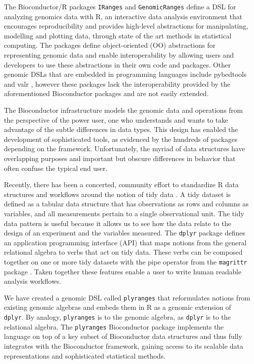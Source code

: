 \documentclass[]{article}
\begin{document}
The Bioconductor/R packages \texttt{IRanges} and \texttt{GenomicRanges}
\autocites{r-core}{Lawrence2013-wg}{Huber2015-ei} define a DSL for
analyzing genomics data with R, an interactive data analysis environment
that encourages reproducibility and provides high-level abstractions for
manipulating, modelling and plotting data, through state of the art
methods in statistical computing. The packages define object-oriented
(OO) abstractions for representing genomic data and enable
interoperability by allowing users and developers to use these
abstractions in their own code and packages. Other genomic DSLs that are
embedded in programming languages include pybedtools and valr
\autocites{Dale2011-js}{Kent2017}, however these packages lack the
interoperability provided by the aforementioned Bioconductor packages
and are not easily extended.

The Bioconductor infrastructure models the genomic data and operations
from the perspective of the power user, one who understands and wants to
take advantage of the subtle differences in data types. This design has
enabled the development of sophisticated tools, as evidenced by the
hundreds of packages depending on the framework. Unfortunately, the
myriad of data structures have overlapping purposes and important but
obscure differences in behavior that often confuse the typical end user.

Recently, there has been a concerted, community effort to standardize R
data structures and workflows around the notion of tidy data
\cite{Wickham2014-jc}. A tidy dataset is defined as a tabular data
structure that has observations as rows and columns as variables, and
all measurements pertain to a single observational unit. The tidy data
pattern is useful because it allows us to see how the data relate to the
design of an experiment and the variables measured. The \texttt{dplyr}
package \cite{Wickham2017-dplyr} defines an application programming
interface (API) that maps notions from the general relational algebra to
verbs that act on tidy data. These verbs can be composed together on one
or more tidy datasets with the pipe operator from the \texttt{magrittr}
package \cite{R-magrittr}. Taken together these features enable a user
to write human readable analysis workflows.

We have created a genomic DSL called \texttt{plyranges} that
reformulates notions from existing genomic algebras and embeds them in R
as a genomic extension of \texttt{dplyr}. By analogy, \texttt{plyranges}
is to the genomic algebra, as \texttt{dplyr} is to the relational
algebra. The \texttt{plyranges} Bioconductor package implements the
language on top of a key subset of Bioconductor data structures and thus
fully integrates with the Bioconductor framework, gaining access to its
scalable data representations and sophisticated statistical methods.
\end{document}
